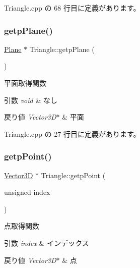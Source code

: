  Triangle.\+cpp の 68 行目に定義があります。

\mbox{\label{class_triangle_a4d0713aa2052d4b6cbde72202bcaca20}} 
\subsubsection{\texorpdfstring{getp\+Plane()}{getpPlane()}}
{\footnotesize\ttfamily \mbox{\hyperlink{class_plane}{Plane}} $\ast$ Triangle\+::getp\+Plane (\begin{DoxyParamCaption}{ }\end{DoxyParamCaption})}



平面取得関数 


\begin{DoxyParams}{引数}
{\em void} & なし \\
\hline
\end{DoxyParams}

\begin{DoxyRetVals}{戻り値}
{\em Vector3\+D$\ast$} & 平面 \\
\hline
\end{DoxyRetVals}


 Triangle.\+cpp の 27 行目に定義があります。

\mbox{\label{class_triangle_a6975e48159ebbeeecce96691e039606a}} 
\subsubsection{\texorpdfstring{getp\+Point()}{getpPoint()}}
{\footnotesize\ttfamily \mbox{\hyperlink{class_vector3_d}{Vector3D}} $\ast$ Triangle\+::getp\+Point (\begin{DoxyParamCaption}\item[{unsigned}]{index }\end{DoxyParamCaption})}



点取得関数 


\begin{DoxyParams}{引数}
{\em index} & インデックス \\
\hline
\end{DoxyParams}

\begin{DoxyRetVals}{戻り値}
{\em Vector3\+D$\ast$} & 点 \\
\hline
\end{DoxyRetVals}


